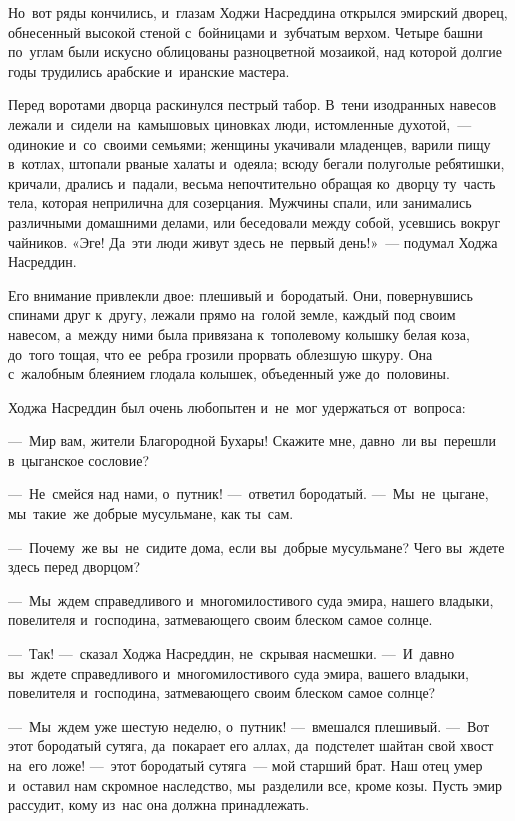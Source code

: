 \documentclass[12pt,a4paper]{book}
\begin{document}
Но~вот ряды кончились, и~глазам Ходжи Насреддина открылся эмирский дворец, обнесенный высокой стеной с~бойницами и~зубчатым верхом. Четыре башни по~углам были искусно облицованы разноцветной мозаикой, над которой долгие годы трудились арабские и~иранские мастера.

Перед воротами дворца раскинулся пестрый табор. В~тени изодранных навесов лежали и~сидели на~камышовых циновках люди, истомленные духотой,~— одинокие и~со~своими семьями; женщины укачивали младенцев, варили пищу в~котлах, штопали рваные халаты и~одеяла; всюду бегали полуголые ребятишки, кричали, дрались и~падали, весьма непочтительно обращая ко~дворцу ту~часть тела, которая неприлична для созерцания. Мужчины спали, или занимались различными домашними делами, или беседовали между собой, усевшись вокруг чайников. «Эге! Да~эти люди живут здесь не~первый день!»~— подумал Ходжа Насреддин.

Его внимание привлекли двое: плешивый и~бородатый. Они, повернувшись спинами друг к~другу, лежали прямо на~голой земле, каждый под своим навесом, а~между ними была привязана к~тополевому колышку белая коза, до~того тощая, что ее~ребра грозили прорвать облезшую шкуру. Она с~жалобным блеянием глодала колышек, объеденный уже до~половины.

Ходжа Насреддин был очень любопытен и~не~мог удержаться от~вопроса:

—~Мир вам, жители Благородной Бухары! Скажите мне, давно~ли вы~перешли в~цыганское сословие?

—~Не~смейся над нами, о~путник! —~ответил бородатый. —~Мы~не~цыгане, мы~такие~же добрые мусульмане, как ты~сам.

—~Почему~же вы~не~сидите дома, если вы~добрые мусульмане? Чего вы~ждете здесь перед дворцом?

—~Мы~ждем справедливого и~многомилостивого суда эмира, нашего владыки, повелителя и~господина, затмевающего своим блеском самое солнце.

—~Так! —~сказал Ходжа Насреддин, не~скрывая насмешки. —~И~давно вы~ждете справедливого и~многомилостивого суда эмира, вашего владыки, повелителя и~господина, затмевающего своим блеском самое солнце?

—~Мы~ждем уже шестую неделю, о~путник! —~вмешался плешивый. —~Вот этот бородатый сутяга, да~покарает его аллах, да~подстелет шайтан свой хвост на~его ложе! —~этот бородатый сутяга~— мой старший брат. Наш отец умер и~оставил нам скромное наследство, мы~разделили все, кроме козы. Пусть эмир рассудит, кому из~нас она должна принадлежать.
\end{document}
